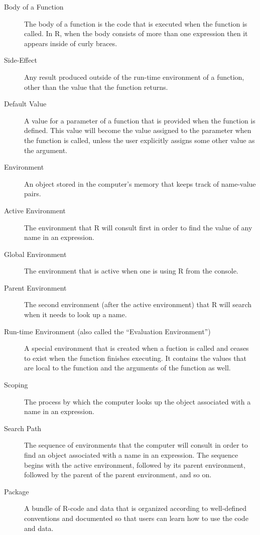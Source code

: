 \documentclass[]{book}
\theoremstyle{definition}
\theoremstyle{definition}
\theoremstyle{definition}
\theoremstyle{remark}
\begin{document}
{\begin{description}
\item[Body of a Function ]
The body of a function is the code that is executed when the function is
called. In R, when the body consists of more than one expression then it
appears inside of curly braces.
\item[Side-Effect ]
Any result produced outside of the run-time environment of a function,
other than the value that the function returns.
\item[Default Value ]
A value for a parameter of a function that is provided when the function
is defined. This value will become the value assigned to the parameter
when the function is called, unless the user explicitly assigns some
other value as the argument.
\item[Environment ]
An object stored in the computer's memory that keeps track of name-value
pairs.
\item[Active Environment ]
The environment that R will consult first in order to find the value of
any name in an expression.
\item[Global Environment ]
The environment that is active when one is using R from the console.
\item[Parent Environment ]
The second environment (after the active environment) that R will search
when it needs to look up a name.
\item[Run-time Environment (also called the ``Evaluation Environment'')
]
A special environment that is created when a fuction is called and
ceases to exist when the function finishes executing. It contains the
values that are local to the function and the arguments of the function
as well.
\item[Scoping ]
The process by which the computer looks up the object associated with a
name in an expression.
\item[Search Path ]
The sequence of environments that the computer will consult in order to
find an object associated with a name in an expression. The sequence
begins with the active environment, followed by its parent environment,
followed by the parent of the parent environment, and so on.
\item[Package ]
A bundle of R-code and data that is organized according to well-defined
conventions and documented so that users can learn how to use the code
and data.
\end{description}

}
\end{document}
